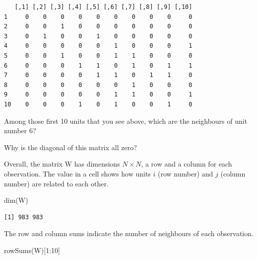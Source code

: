 \documentclass[
  letterpaper,
]{scrbook}
\newenvironment{Shaded}{\begin{snugshade}}{\end{snugshade}}
\newcommand{\DecValTok}[1]{\textcolor[rgb]{0.68,0.00,0.00}{#1}}
\newcommand{\FunctionTok}[1]{\textcolor[rgb]{0.28,0.35,0.67}{#1}}
\newcommand{\NormalTok}[1]{\textcolor[rgb]{0.00,0.23,0.31}{#1}}
\newcommand{\SpecialCharTok}[1]{\textcolor[rgb]{0.37,0.37,0.37}{#1}}
\begin{document}
\begin{verbatim}
   [,1] [,2] [,3] [,4] [,5] [,6] [,7] [,8] [,9] [,10]
1     0    0    0    0    0    0    0    0    0     0
2     0    0    1    0    0    0    0    0    0     0
3     0    1    0    0    1    0    0    0    0     0
4     0    0    0    0    0    1    0    0    0     1
5     0    0    1    0    0    1    1    0    0     0
6     0    0    0    1    1    0    1    0    1     1
7     0    0    0    0    1    1    0    1    1     0
8     0    0    0    0    0    0    1    0    0     0
9     0    0    0    0    0    1    1    0    0     1
10    0    0    0    1    0    1    0    0    1     0
\end{verbatim}

\begin{tcolorbox}[enhanced jigsaw, colframe=quarto-callout-tip-color-frame, coltitle=black, titlerule=0mm, opacitybacktitle=0.6, toprule=.15mm, colbacktitle=quarto-callout-tip-color!10!white, toptitle=1mm, leftrule=.75mm, colback=white, bottomtitle=1mm, opacityback=0, left=2mm, title=\textcolor{quarto-callout-tip-color}{\faLightbulb}\hspace{0.5em}{Question}, breakable, arc=.35mm, rightrule=.15mm, bottomrule=.15mm]

Among those first 10 units that you see above, which are the neighbours
of unit number 6?

Why is the diagonal of this matrix all zero?

\end{tcolorbox}

Overall, the matrix W has dimensions \(N \times N\), a row and a column
for each observation. The value in a cell shows how units \(i\) (row
number) and \(j\) (column number) are related to each other.

\begin{Shaded}
\begin{Highlighting}[]
\FunctionTok{dim}\NormalTok{(W)}
\end{Highlighting}
\end{Shaded}

\begin{verbatim}
[1] 983 983
\end{verbatim}

The row and column sums indicate the number of neighbours of each
observation.

\begin{Shaded}
\begin{Highlighting}[]
\FunctionTok{rowSums}\NormalTok{(W)[}\DecValTok{1}\SpecialCharTok{:}\DecValTok{10}\NormalTok{]}
\end{Highlighting}
\end{Shaded}
\end{document}
